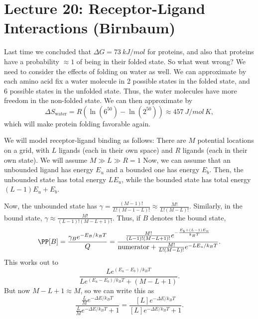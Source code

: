 \section*{Lecture 20: Receptor-Ligand Interactions (Birnbaum)}
\setcounter{section}{20}

Last time we concluded that $\Delta G = \SI{73}{kJ/mol}$ for proteins, and also that proteins have a probability $\approx 1$ of being in their folded state. So what went wrong?
We need to consider the effects of folding on water as well.
We can approximate by each amino acid fix a water molecule in 2 possible states in the folded state, and 6 possible states in the unfolded state. Thus, the water molecules have more freedom in the non-folded state. We can then approximate by \[
	\Delta S_{\text{water}} = R(\ln(6^{50}) - \ln(2^{50})) \approx \SI{457}{J/mol\,K},
\]
which will make protein folding favorable again.

\begin{exm}
	We will model receptor-ligand binding as follows: There are $M$ potential locations on a grid, with $L$ ligands (each in their own space) and $R$ ligands (each in their own state). We will assume $M\gg L \gg R =1$
	Now, we can assume that an unbounded ligand has energy $E_u$ and a bounded one has energy $E_b$.
	Then, the unbounded state has total energy $LE_u$, while the bounded state has total energy $(L-1)E_u + E_b$.

	Now, the unbounded state has $\gamma = \frac{(M-1)!}{L!(M-1-L)!} \approx \frac{M!}{L!(M-L)!}$.
	Similarly, in the bound state, $\gamma \approx \frac{M!}{(L-1)!(M-L+1)!}$.
	Thus, if $B$ denotes the bound state, \[
		\PP[B] = \frac{\gamma_B e^{-E_B/k_BT}}{Q} = \frac{\frac{M!}{(L-1)!(M-L+1)!} e^{-\frac{E_b + (L-1)E_u}{k_BT}}}{\text{numerator} + \frac{M!}{L!(M-L)!} e^{-LE_u/k_BT}}.
	\]
	This works out to \[
		\frac{Le^{(E_u-E_b)/k_BT}}{Le^{(E_u-E_b)/k_BT} + (M-L+1)}.
	\]
	But now $M-L+1 \approx M$, so we can write this as \[
		\frac{\frac LM e^{-\Delta E/k_BT}}{\frac LM e^{-\Delta E/k_BT} + 1} = \frac{[L] e^{-\Delta E/k_BT}}{[L] e^{-\Delta E/k_BT} + 1}.
	\]
\end{exm}
